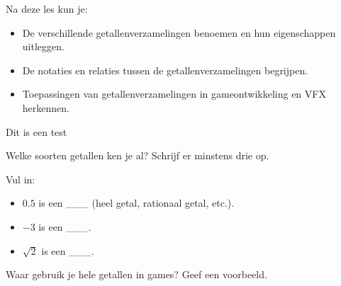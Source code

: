 \documentclass{../myximera}
\begin{document}



Na deze les kun je:
\begin{itemize}
    \item De verschillende getallenverzamelingen benoemen en hun eigenschappen uitleggen.
    \item De notaties en relaties tussen de getallenverzamelingen begrijpen.
    \item Toepassingen van getallenverzamelingen in gameontwikkeling en VFX herkennen.
\end{itemize}
\begin{doelstelling}
    Dit is een test
\end{doelstelling}
\begin{exercise}
\begin{question}
Welke soorten getallen ken je al? Schrijf er minstens drie op.
\end{question}
\begin{question}
Vul in:
\begin{itemize}
    \item \( 0.5 \) is een \_\_\_ (heel getal, rationaal getal, etc.).
    \item \( -3 \) is een \_\_\_.
    \item \( \sqrt{2} \) is een \_\_\_.
\end{itemize}
\end{question}
\begin{question}
Waar gebruik je hele getallen in games? Geef een voorbeeld.
\end{question}
\end{exercise}

\end{document}
